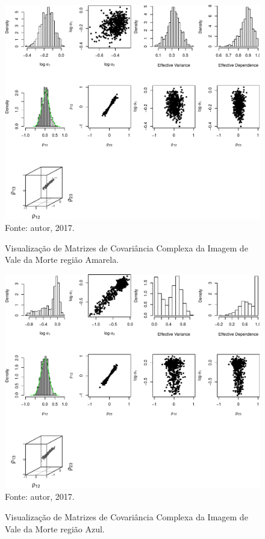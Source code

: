 \documentclass[a4paper,12pt]{article}
\begin{document}
\newpage


\begin{figure}[ht]
\centering
\caption{Visualização de Matrizes de Covariância Complexa da Imagem de Vale da Morte região Amarela.}
\includegraphics[width=\linewidth]{../../Figuras/Amostras-Death/Death-Amarela-500.pdf}\\
Fonte: autor, 2017.
\label{visDeath1}
\end{figure}

\newpage

\begin{figure}[ht]
\centering
\caption{Visualização de Matrizes de Covariância Complexa da Imagem de Vale da Morte região Azul.}
\includegraphics[width=\linewidth]{../../Figuras/Amostras-Death/Death-Azul-500.pdf}\\
Fonte: autor, 2017.
\label{visDeath2}
\end{figure}
\end{document}
